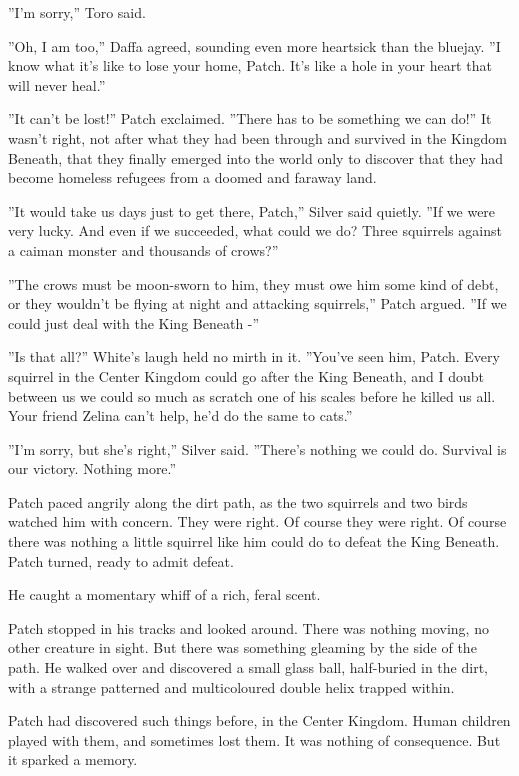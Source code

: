 \documentclass[12pt]{book}
\begin{document}
''I'm sorry,'' Toro said.

''Oh, I am too,'' Daffa agreed, sounding even more heartsick than the bluejay. ''I know what it's like to lose your home, Patch. It's like a hole in your heart that will never heal.''

''It can't be lost!'' Patch exclaimed. ''There has to be something we can do!'' It wasn't right, not after what they had been through and survived in the Kingdom Beneath, that they finally emerged into the world only to discover that they had become homeless refugees from a doomed and faraway land.

''It would take us days just to get there, Patch,'' Silver said quietly. ''If we were very lucky. And even if we succeeded, what could we do? Three squirrels against a caiman monster and thousands of crows?'' 

''The crows must be moon-sworn to him, they must owe him some kind of debt, or they wouldn't be flying at night and attacking squirrels,'' Patch argued. ''If we could just deal with the King Beneath -''

''Is that all?'' White's laugh held no mirth in it. ''You've seen him, Patch. Every squirrel in the Center Kingdom could go after the King Beneath, and I doubt between us we could so much as scratch one of his scales before he killed us all. Your friend Zelina can't help, he'd do the same to cats.''

''I'm sorry, but she's right,'' Silver said. ''There's nothing we could do. Survival is our victory. Nothing more.''

Patch paced angrily along the dirt path, as the two squirrels and two birds watched him with concern. They were right. Of course they were right. Of course there was nothing a little squirrel like him could do to defeat the King Beneath. Patch turned, ready to admit defeat.

He caught a momentary whiff of a rich, feral scent.

Patch stopped in his tracks and looked around. There was nothing moving, no other creature in sight. But there was something gleaming by the side of the path. He walked over and discovered a small glass ball, half-buried in the dirt, with a strange patterned and multicoloured double helix trapped within.

Patch had discovered such things before, in the Center Kingdom. Human children played with them, and sometimes lost them. It was nothing of consequence. But it sparked a memory.
\end{document}
